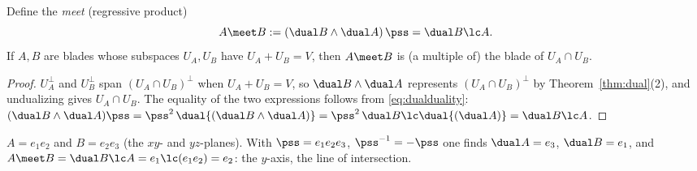 \begin{corollary}\label{cor:meet}
Define the \emph{meet} (regressive product)
\[
 A\meet B:=(\dual B\wedge\dual A)\,\pss=\dual B\lc A .
\]
If $A,B$ are blades whose subspaces $U_A,U_B$ have $U_A+U_B=V$, then $A\meet B$ is (a multiple of) the blade of $U_A\cap U_B$.
\end{corollary}
\begin{proof}
$U_A^\perp$ and $U_B^\perp$ span $(U_A\cap U_B)^\perp$ when $U_A+U_B=V$, so $\dual B\wedge\dual A$ represents $(U_A\cap U_B)^\perp$ by Theorem~\ref{thm:dual}(2), and undualizing gives $U_A\cap U_B$. The equality of the two expressions follows from \eqref{eq:dualduality}: $(\dual B\wedge\dual A)\pss=\pss^2\,\dual{(\dual B\wedge\dual A)}=\pss^2\,\dual B\lc\dual{(\dual A)}=\dual B\lc A$.
\end{proof}

\begin{example}
$A=e_1e_2$ and $B=e_2e_3$ (the $xy$- and $yz$-planes). With $\pss=e_1e_2e_3$, $\pss^{-1}=-\pss$ one finds $\dual A=e_3$, $\dual B=e_1$, and $A\meet B=\dual B\lc A=e_1\lc(e_1e_2)=e_2$: the $y$-axis, the line of intersection.
\end{example}
